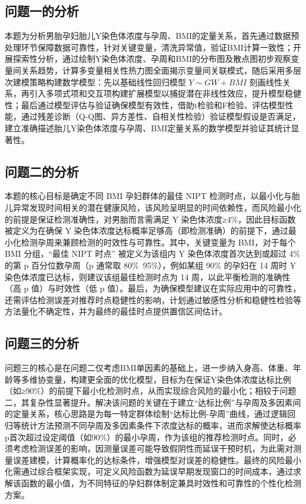 \documentclass[withoutpreface,bwprint]{cumcmthesis} %
\begin{document}
\subsection{问题一的分析}

本题为分析男胎孕妇胎儿Y染色体浓度与孕周、BMI的定量关系，首先通过数据预处理环节保障数据可靠性，针对关键变量，清洗异常值，验证BMI计算一致性；开展探索性分析，通过绘制Y染色体浓度、孕周和BMI的分布图及散点图初步观察变量间关系趋势，计算多变量相关性热力图全面揭示变量间关联模式，随后采用多层次建模策略构建数学模型：先以基础线性回归模型 $Y \sim GW + BMI$ 刻画线性关系，再引入多项式项和交互项构建扩展模型以捕捉潜在非线性效应，提升模型稳健性；最后通过模型评估与验证确保模型有效性，借助t检验和F检验、评估模型性能，通过残差诊断（Q-Q图、异方差性、自相关性检验）验证模型假设是否满足，建立准确描述胎儿Y染色体浓度与孕周、BMI定量关系的数学模型并验证其统计显著性。

\subsection{问题二的分析}

本题的核心目标是确定不同 BMI 孕妇群体的最佳 NIPT 检测时点，以最小化与胎儿异常发现时间相关的潜在健康风险，该风险呈明显的时间依赖性，而风险最小化的前提是保证检测准确性，对男胎而言需满足 Y 染色体浓度≥4\%，因此目标函数被定义为在确保 Y 染色体浓度达标概率足够高（即检测准确）的前提下，通过最小化检测孕周来兼顾检测的时效性与可靠性。其中，关键变量为 BMI，对于每个 BMI 分组，“最佳 NIPT 时点” 被定义为该组内 Y 染色体浓度首次达到或超过 4\% 的第 p 百分位数孕周（p 通常取 80\%~95\%），例如某组 90\% 的孕妇在 14 周时 Y 染色体浓度已达标，则建议该组最佳检测时点为 14 周，以此平衡检测的准确性（高 p 值）与时效性（低 p 值）。最后，为确保模型建议在实际应用中的可靠性，还需评估检测误差对推荐时点稳健性的影响，计划通过敏感性分析和稳健性检验等方法量化不确定性，并为最终的最佳时点提供置信区间估计。
 

\subsection{问题三的分析}
问题三的核心是在问题二仅考虑BMI单因素的基础上，进一步纳入身高、体重、年龄等多维协变量，构建更全面的优化模型，目标为在保证Y染色体浓度达标比例（如≥90\%）的前提下最小化检测时点，从而实现综合风险的最小化；相较于问题二，其复杂性显著提升。解决该问题的关键在于建立“达标比例”与孕周及多因素间的定量关系，核心思路是为每一特定群体绘制“达标比例-孕周”曲线，通过逻辑回归等统计方法预测不同孕周及多因素条件下浓度达标的概率，进而求解使达标概率p首次超过设定阈值（如90\%）的最小孕周，作为该组的推荐检测时点。同时，必须考虑检测误差的影响，因测量误差可能导致假阴性而延误干预时机，为此需对测量误差建模，计算概率化的达标条件，增强模型对误差的稳健性。最终的风险最小化需通过综合框架实现，可定义风险函数为延误早期发现窗口的时间成本，通过求解该函数的最小值，为不同特征的孕妇群体制定兼具时效性和可靠性的个性化检测方案。
\end{document}
